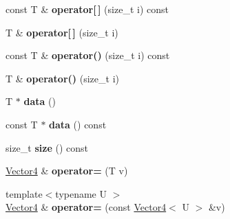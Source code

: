 \begin{DoxyCompactItemize}
\item 
\mbox{\label{struct_p_o_p_1_1_vector4_a02197fa04dedd5ef0d0b79ef7bad86ab}} 
const T \& {\bfseries operator\mbox{[}$\,$\mbox{]}} (size\+\_\+t i) const
\item 
\mbox{\label{struct_p_o_p_1_1_vector4_a72c2dce062bf64a52fbe94aae638fcfd}} 
T \& {\bfseries operator\mbox{[}$\,$\mbox{]}} (size\+\_\+t i)
\item 
\mbox{\label{struct_p_o_p_1_1_vector4_a2adf08d9418eab889007421eed2d4fa9}} 
const T \& {\bfseries operator()} (size\+\_\+t i) const
\item 
\mbox{\label{struct_p_o_p_1_1_vector4_afe198076194d8a5b14f8033d40959ff1}} 
T \& {\bfseries operator()} (size\+\_\+t i)
\item 
\mbox{\label{struct_p_o_p_1_1_vector4_a24377a734c16bcf7702cd87fbd5b0efd}} 
T $\ast$ {\bfseries data} ()
\item 
\mbox{\label{struct_p_o_p_1_1_vector4_a23b6139794009a9ee0afaa47b58511b7}} 
const T $\ast$ {\bfseries data} () const
\item 
\mbox{\label{struct_p_o_p_1_1_vector4_a1936600600dfac716c3879542e4b91de}} 
size\+\_\+t {\bfseries size} () const
\item 
\mbox{\label{struct_p_o_p_1_1_vector4_a76feb6eb3bd2f0a7dedc06720e7d2f76}} 
\mbox{\hyperlink{struct_p_o_p_1_1_vector4}{Vector4}} \& {\bfseries operator=} (T v)
\item 
\mbox{\label{struct_p_o_p_1_1_vector4_a26d5f205d2d60dc2488a229e8a5e5f80}} 
{\footnotesize template$<$typename U $>$ }\\\mbox{\hyperlink{struct_p_o_p_1_1_vector4}{Vector4}} \& {\bfseries operator=} (const \mbox{\hyperlink{struct_p_o_p_1_1_vector4}{Vector4}}$<$ U $>$ \&v)
\item 
\mbox{\label{struct_p_o_p_1_1_vector4_a12bc7b42442eae434c7e8f30e84b3bfc}} 

\end{DoxyCompactItemize}
